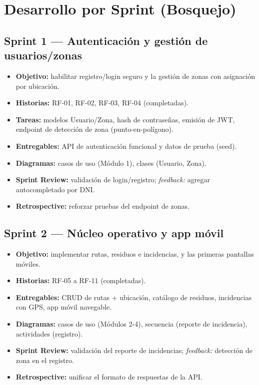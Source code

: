 \documentclass[11pt,a4paper]{article}
\begin{document}
\newpage
\section{Desarrollo por Sprint (Bosquejo)}

\subsection{Sprint 1 — Autenticación y gestión de usuarios/zonas}
\begin{itemize}[leftmargin=*]
    \item \textbf{Objetivo:} habilitar registro/login seguro y la gestión de zonas con asignación por ubicación.
    \item \textbf{Historias:} RF-01, RF-02, RF-03, RF-04 (completadas).
    \item \textbf{Tareas:} modelos Usuario/Zona, hash de contraseñas, emisión de JWT, endpoint de detección de zona (punto-en-polígono).
    \item \textbf{Entregables:} API de autenticación funcional y datos de prueba (seed).
    \item \textbf{Diagramas:} casos de uso (Módulo 1), clases (Usuario, Zona).
    \item \textbf{Sprint Review:} validación de login/registro; \textit{feedback:} agregar autocompletado por DNI.
    \item \textbf{Retrospective:} reforzar pruebas del endpoint de zonas.
\end{itemize}

\subsection{Sprint 2 — Núcleo operativo y app móvil}
\begin{itemize}[leftmargin=*]
    \item \textbf{Objetivo:} implementar rutas, residuos e incidencias, y las primeras pantallas móviles.
    \item \textbf{Historias:} RF-05 a RF-11 (completadas).
    \item \textbf{Entregables:} CRUD de rutas + ubicación, catálogo de residuos, incidencias con GPS, app móvil navegable.
    \item \textbf{Diagramas:} casos de uso (Módulos 2-4), secuencia (reporte de incidencia), actividades (registro).
    \item \textbf{Sprint Review:} validación del reporte de incidencias; \textit{feedback:} detección de zona en el registro.
    \item \textbf{Retrospective:} unificar el formato de respuestas de la API.
\end{itemize}
\end{document}
